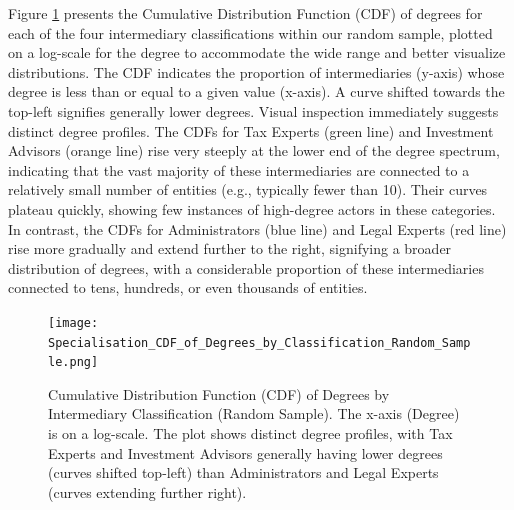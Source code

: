 Figure \ref{fig:specialisation_cdf_degrees} presents the Cumulative Distribution Function (CDF) of degrees for each of the four intermediary classifications within our random sample, plotted on a log-scale for the degree to accommodate the wide range and better visualize distributions. The CDF indicates the proportion of intermediaries (y-axis) whose degree is less than or equal to a given value (x-axis). A curve shifted towards the top-left signifies generally lower degrees. Visual inspection immediately suggests distinct degree profiles. The CDFs for Tax Experts (green line) and Investment Advisors (orange line) rise very steeply at the lower end of the degree spectrum, indicating that the vast majority of these intermediaries are connected to a relatively small number of entities (e.g., typically fewer than 10). Their curves plateau quickly, showing few instances of high-degree actors in these categories. In contrast, the CDFs for Administrators (blue line) and Legal Experts (red line) rise more gradually and extend further to the right, signifying a broader distribution of degrees, with a considerable proportion of these intermediaries connected to tens, hundreds, or even thousands of entities.

\begin{figure}[htbp]
    \centering
    \texttt{[image: Specialisation\_CDF\_of\_Degrees\_by\_Classification\_Random\_Sample.png]}
    \caption{Cumulative Distribution Function (CDF) of Degrees by Intermediary Classification (Random Sample). The x-axis (Degree) is on a log-scale. The plot shows distinct degree profiles, with Tax Experts and Investment Advisors generally having lower degrees (curves shifted top-left) than Administrators and Legal Experts (curves extending further right).}
    \label{fig:specialisation_cdf_degrees}
\end{figure}

